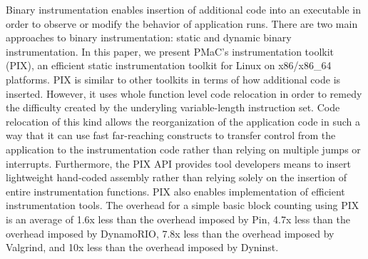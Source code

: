 \begin{it}

Binary instrumentation enables insertion of additional code into an
executable in order to observe or modify the behavior of application runs. 
There are two main approaches to binary instrumentation: static and dynamic
binary instrumentation. In this paper, we present PMaC's instrumentation toolkit (PIX), 
an efficient static  instrumentation toolkit for Linux on x86/x86\_64 platforms. PIX
is similar to  other toolkits in terms of how additional code is inserted. However, it uses whole function level
code relocation in order to remedy the difficulty created by the underyling variable-length instruction set. 
Code relocation of this kind allows the reorganization of the application code in such a way that it
can use  fast  far-reaching constructs to transfer control
from the application to the instrumentation code rather than relying on multiple
jumps or interrupts. Furthermore, the PIX API provides 
tool developers means to insert lightweight hand-coded assembly
rather than relying solely on the insertion of entire instrumentation functions.
PIX also enables implementation of efficient instrumentation tools. 
The overhead for a simple basic block counting using PIX is an
average of 1.6x less than the overhead imposed by Pin, 4.7x less than the overhead imposed by
DynamoRIO, 7.8x less than the overhead imposed by Valgrind, and 10x less than the overhead imposed by Dyninst.

\end{it}
